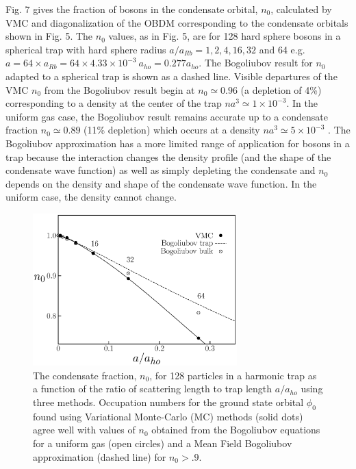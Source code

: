 \documentclass[aps,pra,twocolumn,groupedaddress]{revtex4}
\begin{document}
Fig. 7 gives the fraction of bosons in the condensate orbital, $n_0$, calculated
by VMC and diagonalization of the OBDM corresponding to the condensate orbitals
shown in Fig. 5. The $n_0$ values, as in Fig. 5, are for 128 hard sphere bosons
in a spherical trap with hard sphere radius $a/a_{Rb} = 1, 2, 4, 16, 32$ and 64
e.g. $a = 64 \times a_{Rb} = 64 \times 4.33\times10^{-3}\ a_{ho} = 0.277 a_{ho}$. The
Bogoliubov \cite{bogoliubov47} result for $n_0$ adapted to a spherical
trap\cite{javanainen96} is shown as a dashed line. Visible departures of the
VMC $n_0$ from the Bogoliubov result begin at $n_0 \simeq 0.96$ (a depletion of
4\%) corresponding to a density at the center of the trap $na^3 \simeq 1 
\times 10^{-3}$. In the uniform gas case, the Bogoliubov result remains accurate
up to a condensate fraction $n_0 \simeq 0.89$ (11\% depletion) which occurs at a
density $na^3 \simeq 5 \times 10^{- 3}$ \cite{giorgini}. The Bogoliubov
approximation has a more limited range of application for bosons in a trap
because the interaction changes the density profile (and the shape of the
condensate wave function) as well as simply depleting the condensate and $n_0$
depends on the density and shape of the condensate wave function. In the uniform
case, the density cannot change.
    \begin{figure}
\begin{center}
\includegraphics[width = 3.1in]{fig7.ps}
 \caption{\footnotesize
The condensate fraction, $n_0$, for 128 particles in
a harmonic trap as a function of the ratio of scattering length to
trap length $a/a_{ho}$ using three
methods.  Occupation numbers for the ground state orbital $\phi_0$
found using Variational Monte-Carlo (MC) methods (solid dots) agree well with
values of $n_0$ obtained from the Bogoliubov equations for a uniform gas (open circles) 
and a Mean Field Bogoliubov approximation (dashed line) \cite{javanainen96}
for $n_0 > .9$.
        }
\end{center}
    \end{figure}
\end{document}
